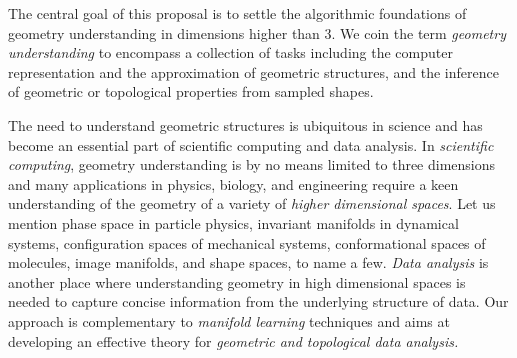 The central goal of this proposal is to settle the algorithmic
foundations of geometry understanding in dimensions higher than 3.  We
coin the term {\em geometry understanding} to encompass a collection
of tasks including the computer representation and the approximation
of geometric structures, and the inference of geometric or topological
properties from sampled
shapes.  %

The need to understand geometric structures is ubiquitous in science
and has become an essential part of {scientific computing} and
{data analysis}. In {\em scientific computing},
geometry understanding is by no means limited to
three dimensions and many applications in physics, biology, and
engineering require a keen understanding of the geometry of a variety
of {\em higher dimensional spaces}. Let us mention phase space in particle
physics, invariant manifolds in dynamical systems, configuration
spaces of mechanical systems, conformational spaces of molecules,
image manifolds, and shape spaces, to name a few.  {\em Data
  analysis} is another place where understanding
geometry in high dimensional spaces is  needed to
 capture concise information from the underlying structure of
 data. Our approach is complementary to {\em manifold learning}
 techniques and aims at  developing an effective theory for {\em geometric and
 topological data analysis.}

